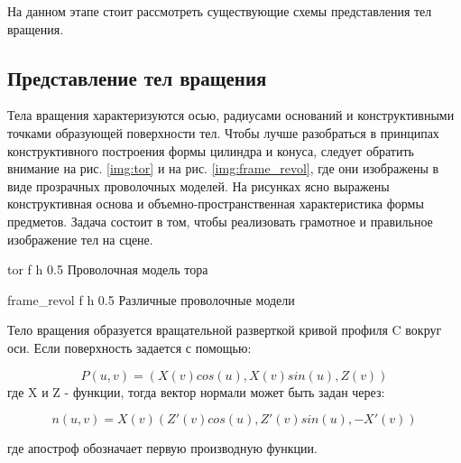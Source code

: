 На данном этапе стоит рассмотреть существующие схемы представления тел вращения.

\subsection{Представление тел вращения}

Тела вращения характеризуются осью, радиусами оснований и конструктивными точками образующей поверхности тел.
Чтобы лучше разобраться в принципах конструктивного построения формы цилиндра и конуса,
следует обратить внимание на рис. \ref{img:tor} и на рис. \ref{img:frame_revol}, где они изображены в виде прозрачных проволочных моделей.
На рисунках ясно выражены конструктивная основа и объемно-пространственная характеристика формы предметов.
Задача состоит в том, чтобы реализовать грамотное и правильное изображение тел на сцене.

{tor} %
{f} %
{h} %
{0.5\textwidth} %
{Проволочная модель тора} %

{frame_revol} %
{f} %
{h} %
{0.5\textwidth} %
{Различные проволочные модели} %

Тело вращения образуется вращательной разверткой кривой профиля C вокруг оси. Если поверхность задается с помощью:\newline

\begin{equation}
P(u, v) = (X(v)cos(u), X(v)sin(u), Z(v))
\end{equation}
где X и Z - функции, тогда вектор нормали может быть задан через:\newline

\begin{equation}
n(u, v) = X(v) (Z' (v)cos(u), Z' (v)sin(u), - X' (v))
\end{equation}

где апостроф обозначает первую производную функции.


